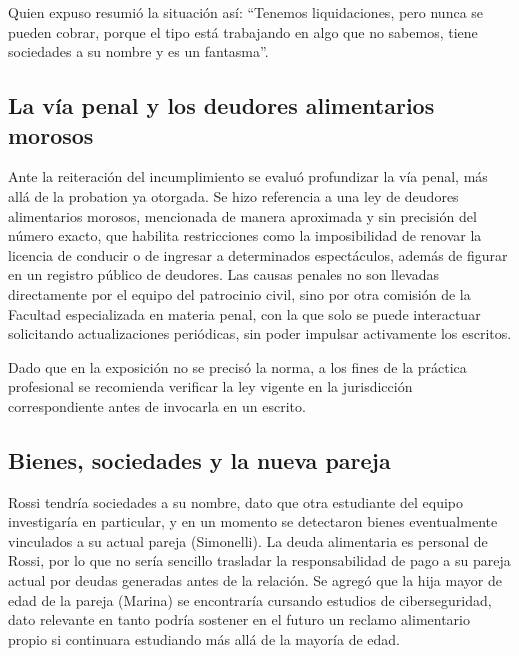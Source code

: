 \documentclass[12pt,oneside]{book}
\begin{document}
Quien expuso resumió la situación así: ``Tenemos liquidaciones, pero nunca se pueden cobrar, porque el tipo está trabajando en algo que no sabemos, tiene sociedades a su nombre y es un fantasma''.

\subsection{La vía penal y los deudores alimentarios morosos}

Ante la reiteración del incumplimiento se evaluó profundizar la vía penal, más allá de la probation ya otorgada. Se hizo referencia a una ley de deudores alimentarios morosos, mencionada de manera aproximada y sin precisión del número exacto, que habilita restricciones como la imposibilidad de renovar la licencia de conducir o de ingresar a determinados espectáculos, además de figurar en un registro público de deudores. Las causas penales no son llevadas directamente por el equipo del patrocinio civil, sino por otra comisión de la Facultad especializada en materia penal, con la que solo se puede interactuar solicitando actualizaciones periódicas, sin poder impulsar activamente los escritos.

\begin{note}
Dado que en la exposición no se precisó la norma, a los fines de la práctica profesional se recomienda verificar la ley vigente en la jurisdicción correspondiente antes de invocarla en un escrito.
\end{note}

\subsection{Bienes, sociedades y la nueva pareja}

Rossi tendría sociedades a su nombre, dato que otra estudiante del equipo investigaría en particular, y en un momento se detectaron bienes eventualmente vinculados a su actual pareja (Simonelli). La deuda alimentaria es personal de Rossi, por lo que no sería sencillo trasladar la responsabilidad de pago a su pareja actual por deudas generadas antes de la relación. Se agregó que la hija mayor de edad de la pareja (Marina) se encontraría cursando estudios de ciberseguridad, dato relevante en tanto podría sostener en el futuro un reclamo alimentario propio si continuara estudiando más allá de la mayoría de edad.
\end{document}
